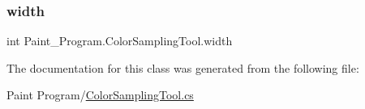 \mbox{\label{class_paint___program_1_1_color_sampling_tool_a49225951211d3ec7e1a476cab018d365}} 
\subsubsection{\texorpdfstring{width}{width}}
{\footnotesize\ttfamily int Paint\+\_\+\+Program.\+Color\+Sampling\+Tool.\+width\hspace{0.3cm}{\ttfamily [private]}}



The documentation for this class was generated from the following file\+:\begin{DoxyCompactItemize}
\item 
Paint Program/\mbox{\hyperlink{_color_sampling_tool_8cs}{Color\+Sampling\+Tool.\+cs}}\end{DoxyCompactItemize}
